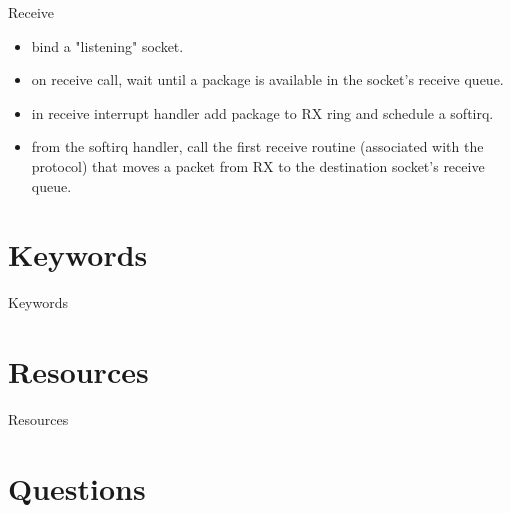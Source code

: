 \documentclass{workshop}
\begin{document}
\begin{frame}{Receive}
\begin{itemize}
\item bind a "listening" socket.
\item on receive call, wait until a package is available in the socket's
receive queue.
\item in receive interrupt handler add package to RX ring and schedule a softirq.
\item from the softirq handler, call the first receive routine (associated
    with the protocol) that moves a packet from RX to the destination socket's receive queue.
\end{itemize}
\end{frame}

\section{Keywords}
\begin{frame}{Keywords}
\end{frame}

\section{Resources}
\begin{frame}{Resources}
\end{frame}

\section{Questions}
\end{document}
